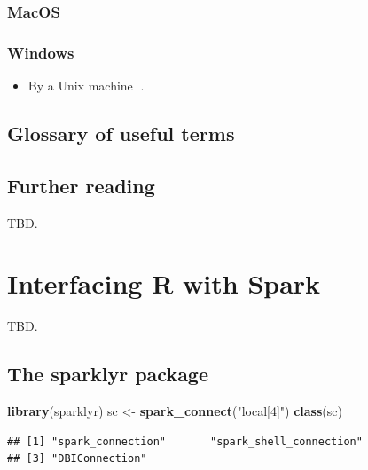 \documentclass[]{book}
\newenvironment{Shaded}{\begin{snugshade}}{\end{snugshade}}
\newcommand{\KeywordTok}[1]{\textcolor[rgb]{0.13,0.29,0.53}{\textbf{#1}}}
\newcommand{\NormalTok}[1]{#1}
\newcommand{\StringTok}[1]{\textcolor[rgb]{0.31,0.60,0.02}{#1}}
\providecommand{\tightlist}{%
  \setlength{\itemsep}{0pt}\setlength{\parskip}{0pt}}
\theoremstyle{definition}
\theoremstyle{definition}
\theoremstyle{definition}
\theoremstyle{remark}
\begin{document}
\hypertarget{macos}{%
\subsection{MacOS}\label{macos}}

\hypertarget{windows}{%
\subsection{Windows}\label{windows}}

\begin{itemize}
\tightlist
\item
  By a Unix machine 🤣.
\end{itemize}

\hypertarget{glossary-of-useful-terms}{%
\section{Glossary of useful terms}\label{glossary-of-useful-terms}}

\hypertarget{further-reading}{%
\section{Further reading}\label{further-reading}}

TBD.

\hypertarget{interfacing-r-with-spark}{%
\chapter{Interfacing R with Spark}\label{interfacing-r-with-spark}}

TBD.

\hypertarget{the-sparklyr-package}{%
\section{The sparklyr package}\label{the-sparklyr-package}}

\begin{Shaded}
\begin{Highlighting}[]
\KeywordTok{library}\NormalTok{(sparklyr)}
\NormalTok{sc <-}\StringTok{ }\KeywordTok{spark_connect}\NormalTok{(}\StringTok{"local[4]"}\NormalTok{)}
\KeywordTok{class}\NormalTok{(sc)}
\end{Highlighting}
\end{Shaded}

\begin{verbatim}
## [1] "spark_connection"       "spark_shell_connection"
## [3] "DBIConnection"
\end{verbatim}
\end{document}
